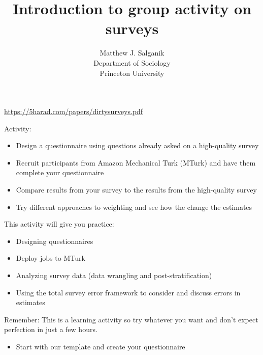 \documentclass[aspectratio=169]{beamer}
\title[]{Introduction to group activity on surveys}
\author[]{Matthew J. Salganik\\Department of Sociology\\Princeton University}
\date[]{%
\vfill
\begin{flushright}
\texttt{[image: figures/cc-by.png]}
\end{flushright}
}
\begin{document}
\frame{\titlepage}
\begin{frame}

\begin{center}
\end{center}

\vfill
\url{https://5harad.com/papers/dirtysurveys.pdf}

\end{frame}
\begin{frame}

Activity:
\begin{itemize}
\item Design a questionnaire using questions already asked on a high-quality survey
\pause
\item Recruit participants from Amazon Mechanical Turk (MTurk) and have them complete your questionnaire  
\pause
\item Compare results from your survey to the results from the high-quality survey
\pause
\item Try different approaches to weighting and see how the change the estimates
\end{itemize}

\end{frame}
\begin{frame}

This activity will give you practice:
\begin{itemize}
\item Designing questionnaires
\pause
\item Deploy jobs to MTurk
\pause
\item Analyzing survey data (data wrangling and post-stratification)
\pause
\item Using the total survey error framework to consider and discuss errors in estimates
\pause
\end{itemize}

\vfill
Remember: This is a learning activity so try whatever you want and don't expect perfection in just a few hours.

\end{frame}
\begin{frame}

\begin{itemize}
\item Start with our template and create your questionnaire
\end{itemize}

\end{frame}
\end{document}
